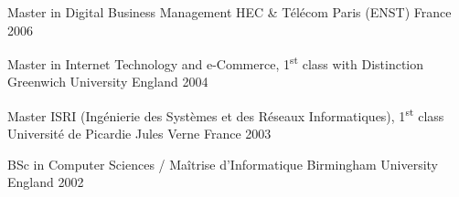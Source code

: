 

\begin{cventries}

  \cventry
    {Master in Digital Business Management} %
    {\hspace{0.5em}HEC \& Télécom Paris (ENST)} %
    {France} %
    {2006} %
    {}
    {}

  \cventry
    {Master in Internet Technology and e-Commerce, 1\textsuperscript{st} class with Distinction} %
    {\hspace{0.5em}Greenwich University} %
    {England} %
    {2004} %
    {}
    {}

  \cventry
    {Master ISRI (Ingénierie des Systèmes et des Réseaux Informatiques), 1\textsuperscript{st} class} %
    {\hspace{0.5em}Université de Picardie Jules Verne} %
    {France} %
    {2003} %
    {}
    {}

  \cventry
    {BSc in Computer Sciences / Maîtrise d'Informatique} %
    {\hspace{0.5em}Birmingham University} %
    {England} %
    {2002} %
    {}
    {}
\end{cventries}
